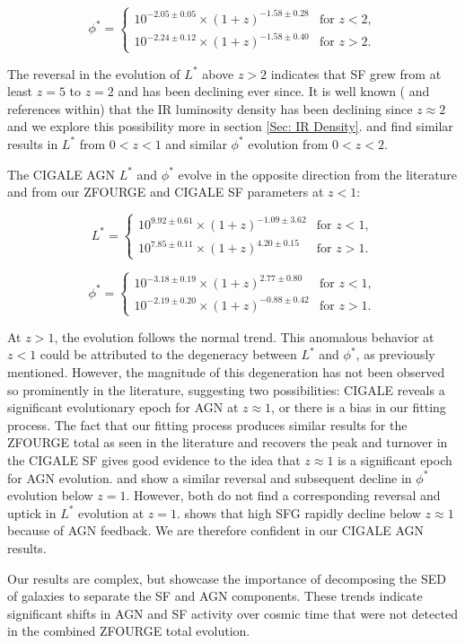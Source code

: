 \begin{equation*}
    \phi^{*} =
    \begin{cases} 
        10^{-2.05 \pm 0.05} \times (1+z)^{-1.58 \pm 0.28} & \text{for } z < 2, \\
        10^{-2.24 \pm 0.12} \times (1+z)^{-1.58 \pm 0.40} & \text{for } z > 2.
    \end{cases}
\end{equation*}

The reversal in the evolution of $L^{*}$ above $z>2$ indicates that SF grew from at least $z=5$ to $z=2$ and has been declining ever since. It is well known (\citealp{gruppioni_herschel_2013,  madau_cosmic_2014} and references within) that the IR luminosity density has been declining since $z\approx2$ and we explore this possibility more in section \ref{Sec: IR Density}. \cite{gruppioni_herschel_2013} and \cite{magnelli_deepest_2013} find similar results in $L^{*}$ from $0<z<1$ and similar $\phi^{*}$ evolution from $0<z<2$. 

The CIGALE AGN $L^{*}$ and $\phi^{*}$ evolve in the opposite direction from the literature and from our ZFOURGE and CIGALE SF parameters at $z<1$:

\begin{equation*}
    L^{*} =
    \begin{cases} 
        10^{9.92 \pm 0.61} \times (1+z)^{-1.09 \pm 3.62} & \text{for } z < 1, \\
        10^{7.85 \pm 0.11} \times (1+z)^{4.20 \pm 0.15} & \text{for } z > 1.
    \end{cases}
\end{equation*}

\begin{equation*}
    \phi^{*} =
    \begin{cases} 
        10^{-3.18 \pm 0.19} \times (1+z)^{2.77 \pm 0.80} & \text{for } z < 1, \\
        10^{-2.19 \pm 0.20} \times (1+z)^{-0.88 \pm 0.42} & \text{for } z > 1.
    \end{cases}
\end{equation*}

At $z>1$, the evolution follows the normal trend. This anomalous behavior at $z<1$ could be attributed to the degeneracy between $L^{*}$ and $\phi^{*}$, as previously mentioned. However, the magnitude of this degeneration has not been observed so prominently in the literature, suggesting two possibilities: CIGALE reveals a significant evolutionary epoch for AGN at $z\approx1$, or there is a bias in our fitting process. The fact that our fitting process produces similar results for the ZFOURGE total as seen in the literature and recovers the peak and turnover in the CIGALE SF gives good evidence to the idea that $z\approx1$ is a significant epoch for AGN evolution. \cite{hopkins_observational_2007} and \cite{delvecchio_tracing_2014} show a similar reversal and subsequent decline in $\phi^{*}$ evolution below $z=1$. However, both do not find a corresponding reversal and uptick in $L^{*}$ evolution at $z=1$. \cite{katsianis_evolution_2017} shows that high SFG rapidly decline below $z\approx1$ because of AGN feedback. We are therefore confident in our CIGALE AGN results. 

Our results are complex, but showcase the importance of decomposing the SED of galaxies to separate the SF and AGN components. These trends indicate significant shifts in AGN and SF activity over cosmic time that were not detected in the combined ZFOURGE total evolution.